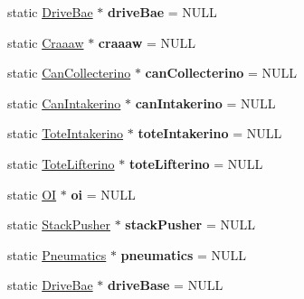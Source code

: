 \begin{DoxyCompactItemize}
\item 
\hypertarget{class_command_base_aa28ad51d4be3179d9a50932b3232292e}{}static \hyperlink{class_drive_bae}{Drive\+Bae} $\ast$ {\bfseries drive\+Bae} = N\+U\+L\+L\label{class_command_base_aa28ad51d4be3179d9a50932b3232292e}

\item 
\hypertarget{class_command_base_af6de215cde5d61baa455454d6811990e}{}static \hyperlink{class_craaaw}{Craaaw} $\ast$ {\bfseries craaaw} = N\+U\+L\+L\label{class_command_base_af6de215cde5d61baa455454d6811990e}

\item 
\hypertarget{class_command_base_a1d3d0334b1085bc85f88c3ea73777a14}{}static \hyperlink{class_can_collecterino}{Can\+Collecterino} $\ast$ {\bfseries can\+Collecterino} = N\+U\+L\+L\label{class_command_base_a1d3d0334b1085bc85f88c3ea73777a14}

\item 
\hypertarget{class_command_base_af9fc2f84b79ccdf1200e915a7d5a58aa}{}static \hyperlink{class_can_intakerino}{Can\+Intakerino} $\ast$ {\bfseries can\+Intakerino} = N\+U\+L\+L\label{class_command_base_af9fc2f84b79ccdf1200e915a7d5a58aa}

\item 
\hypertarget{class_command_base_a7afb80d21b6b8376ef0de8e26e9fb049}{}static \hyperlink{class_tote_intakerino}{Tote\+Intakerino} $\ast$ {\bfseries tote\+Intakerino} = N\+U\+L\+L\label{class_command_base_a7afb80d21b6b8376ef0de8e26e9fb049}

\item 
\hypertarget{class_command_base_aa4a4fb0c3dedaa455327bb3e4217f656}{}static \hyperlink{class_tote_lifterino}{Tote\+Lifterino} $\ast$ {\bfseries tote\+Lifterino} = N\+U\+L\+L\label{class_command_base_aa4a4fb0c3dedaa455327bb3e4217f656}

\item 
\hypertarget{class_command_base_afaa95fd9a7e92e6151185121659ff5ab}{}static \hyperlink{class_o_i}{O\+I} $\ast$ {\bfseries oi} = N\+U\+L\+L\label{class_command_base_afaa95fd9a7e92e6151185121659ff5ab}

\item 
\hypertarget{class_command_base_ac7c414326475e5f7dbeadce1aae6cde4}{}static \hyperlink{class_stack_pusher}{Stack\+Pusher} $\ast$ {\bfseries stack\+Pusher} = N\+U\+L\+L\label{class_command_base_ac7c414326475e5f7dbeadce1aae6cde4}

\item 
\hypertarget{class_command_base_ac630f6f69c61a0c2e9302787ccc1c893}{}static \hyperlink{class_pneumatics}{Pneumatics} $\ast$ {\bfseries pneumatics} = N\+U\+L\+L\label{class_command_base_ac630f6f69c61a0c2e9302787ccc1c893}

\item 
\hypertarget{class_command_base_a792a5be3f4f03fd4c3a74fced81f898a}{}static \hyperlink{class_drive_bae}{Drive\+Bae} $\ast$ {\bfseries drive\+Base} = N\+U\+L\+L\label{class_command_base_a792a5be3f4f03fd4c3a74fced81f898a}

\end{DoxyCompactItemize}


